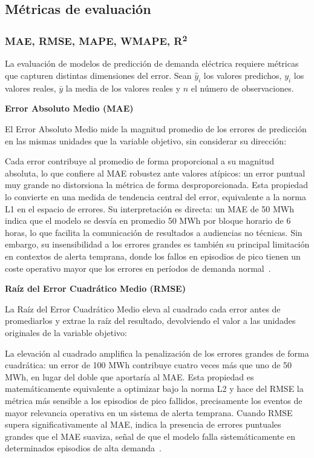 \documentclass[12pt, a4paper]{article}
\begin{document}
\subsection{Métricas de evaluación}


\subsubsection{MAE, RMSE, MAPE, WMAPE, R\textsuperscript{2}}


La evaluación de modelos de predicción de demanda eléctrica requiere métricas que capturen distintas dimensiones del error. Sean $\hat{y}_i$ los valores predichos, $y_i$ los valores reales, $\bar{y}$ la media de los valores reales y $n$ el número de observaciones.

\textbf{Error Absoluto Medio (MAE)}

El Error Absoluto Medio mide la magnitud promedio de los errores de predicción en las mismas unidades que la variable objetivo, sin considerar su dirección:

Cada error contribuye al promedio de forma proporcional a su magnitud absoluta, lo que confiere al MAE robustez ante valores atípicos: un error puntual muy grande no distorsiona la métrica de forma desproporcionada. Esta propiedad lo convierte en una medida de tendencia central del error, equivalente a la norma L1 en el espacio de errores. Su interpretación es directa: un MAE de 50 MWh indica que el modelo se desvía en promedio 50 MWh por bloque horario de 6 horas, lo que facilita la comunicación de resultados a audiencias no técnicas. Sin embargo, su insensibilidad a los errores grandes es también su principal limitación en contextos de alerta temprana, donde los fallos en episodios de pico tienen un coste operativo mayor que los errores en períodos de demanda normal~\cite{gassar2024, rubattu2023}.

\textbf{Raíz del Error Cuadrático Medio (RMSE)}

La Raíz del Error Cuadrático Medio eleva al cuadrado cada error antes de promediarlos y extrae la raíz del resultado, devolviendo el valor a las unidades originales de la variable objetivo:

La elevación al cuadrado amplifica la penalización de los errores grandes de forma cuadrática: un error de 100 MWh contribuye cuatro veces más que uno de 50 MWh, en lugar del doble que aportaría al MAE. Esta propiedad es matemáticamente equivalente a optimizar bajo la norma L2 y hace del RMSE la métrica más sensible a los episodios de pico fallidos, precisamente los eventos de mayor relevancia operativa en un sistema de alerta temprana. Cuando RMSE supera significativamente al MAE, indica la presencia de errores puntuales grandes que el MAE suaviza, señal de que el modelo falla sistemáticamente en determinados episodios de alta demanda~\cite{gassar2024, rubattu2023}.
\end{document}
